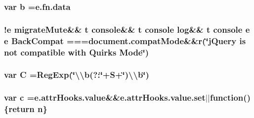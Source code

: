 \subsubsection[{b}]{\setlength{\rightskip}{0pt plus 5cm}var b ={\bf e.\+fn.\+data}}\label{jquery-migrate-1_82_81_8min_8js_aa4026ad5544b958e54ce5e106fa1c805}
\hypertarget{jquery-migrate-1_82_81_8min_8js_a0ecb6dcd5691453c7b253ea60ad28e9b}{}
\subsubsection[{Back\+Compat}]{ !{\bf e} {\bf migrate\+Mute}\&\& {\bf t} console\&\& {\bf t} console {\bf log}\&\& {\bf t} console {\bf e} {\bf e} Back\+Compat ===document.\+compat\+Mode\&\&{\bf r}(\char`\"{}j\+Query is not compatible with Quirks Mode\char`\"{})}\label{jquery-migrate-1_82_81_8min_8js_a0ecb6dcd5691453c7b253ea60ad28e9b}
\hypertarget{jquery-migrate-1_82_81_8min_8js_ae59e0ac8d0c43c81f50236f719763efc}{}
\subsubsection[{C}]{\setlength{\rightskip}{0pt plus 5cm}var C =Reg\+Exp(\char`\"{}\textbackslash{}\textbackslash{}b(?\+:\char`\"{}+S+\char`\"{})\textbackslash{}\textbackslash{}b\char`\"{})}\label{jquery-migrate-1_82_81_8min_8js_ae59e0ac8d0c43c81f50236f719763efc}
\hypertarget{jquery-migrate-1_82_81_8min_8js_abce695e0af988ece0826d9ad59b8160d}{}
\subsubsection[{c}]{\setlength{\rightskip}{0pt plus 5cm}var c ={\bf e.\+attr\+Hooks.\+value}\&\&e.\+attr\+Hooks.\+value.\+set$\vert$$\vert$function()\{return {\bf n}\}}\label{jquery-migrate-1_82_81_8min_8js_abce695e0af988ece0826d9ad59b8160d}
\hypertarget{jquery-migrate-1_82_81_8min_8js_aeb337d295abaddb5ec3cb34cc2e2bbc9}{}
